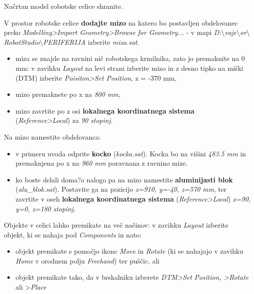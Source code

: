 Načrtan model robotske celice shranite.


\noindent V prostor robotske celice \textbf{dodajte mizo} na katero bo postavljen obdelovanec preko \emph{Modelling>Import Geometry>Browse for Geometry...} - v mapi \newline
\emph{D:$\setminus$vaje$\setminus$or$\setminus$RobotStudio$\setminus$PERIFERIJA}
izberite \emph{miza.sat}.
\begin{itemize}
\item  miza se znajde na ravnini
nič robotskega krmilnika, zato jo premaknite na 0 mm: v
zavihku \emph{Layout} na levi strani izberite mizo in z desno
tipko na miški (DTM) izberite \emph{Poisiton>Set Position}, z = -370 mm,
\item mizo premaknete po x na \emph{800 mm},
\item mizo zavrtite po z osi \textbf{lokalnega koordinatnega sistema} (\emph{Reference>Local}) za \emph{90 stopinj}.
\end{itemize}

Na mizo namestite obdelovanca:
\begin{itemize}
\item  v primeru uvoda odprite \textbf{kocko} (\emph{kocka.sat}). Kocka bo na višini \emph{483.5 mm} in premaknjena po x na \emph{960 mm} poravnana z ravnino mize.
\item ko boste delali doma?o nalogo pa na mizo namestite \textbf{aluminijasti blok} (\emph{alu\_blok.sat}). Postavite ga na pozicijo \emph{x=910, y=-40, z=570 mm}, ter zavrtite v oseh \textbf{lokalnega koordinatnega sistema} (\emph{Reference>Local}) \emph{x=90, y=0, z=180 stopinj}.
\end{itemize}



\noindent Objekte v celici lahko premikate na več načinov: v
zavihku \emph{Layout} izberite objekt, ki se nahaja pod \emph{Components} in nato:
\begin{itemize}
   \item  objekt premikate s pomočjo ikonc \emph{Move} in \emph{Rotate} (ki se nahajajo v zavihku \emph{Home} v orodnem polju \emph{Freehand}) ter puščic, ali
    \item  objekt premikate tako, da v brskalniku izberete \emph{DTM>Set Position, >Rotate} ali >\emph{Place}
\end{itemize}




